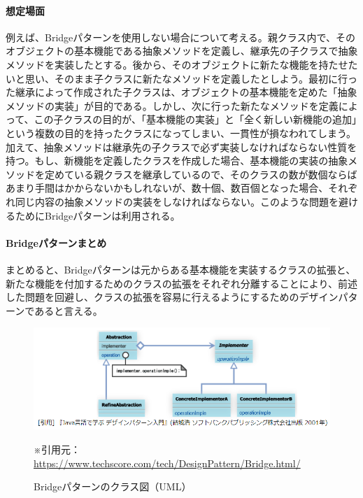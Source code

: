 \documentclass[dvipdfmx]{jsarticle}
\begin{document}
\paragraph{想定場面}
例えば、Bridgeパターンを使用しない場合について考える。親クラス内で、そのオブジェクトの基本機能である抽象メソッドを定義し、継承先の子クラスで抽象メソッドを実装したとする。後から、そのオブジェクトに新たな機能を持たせたいと思い、そのまま子クラスに新たなメソッドを定義したとしよう。最初に行った継承によって作成された子クラスは、オブジェクトの基本機能を定めた「抽象メソッドの実装」が目的である。しかし、次に行った新たなメソッドを定義によって、この子クラスの目的が、「基本機能の実装」と「全く新しい新機能の追加」という複数の目的を持ったクラスになってしまい、一貫性が損なわれてしまう。加えて、抽象メソッドは継承先の子クラスで必ず実装しなければならない性質を持つ。もし、新機能を定義したクラスを作成した場合、基本機能の実装の抽象メソッドを定めている親クラスを継承しているので、そのクラスの数が数個ならばあまり手間はかからないかもしれないが、数十個、数百個となった場合、それぞれ同じ内容の抽象メソッドの実装をしなければならない。このような問題を避けるためにBridgeパターンは利用される。\par

\paragraph{Bridgeパターンまとめ}
まとめると、Bridgeパターンは元からある基本機能を実装するクラスの拡張と、新たな機能を付加するためのクラスの拡張をそれぞれ分離することにより、前述した問題を回避し、クラスの拡張を容易に行えるようにするためのデザインパターンであると言える。
\begin{figure}[H]
  \centering
  \includegraphics[scale=0.6]{ImgMovies/bridge_ex.PNG}
  \caption{Bridgeパターンのクラス図（UML）}
  ※引用元：\url{https://www.techscore.com/tech/DesignPattern/Bridge.html/}
\end{figure}
\end{document}
